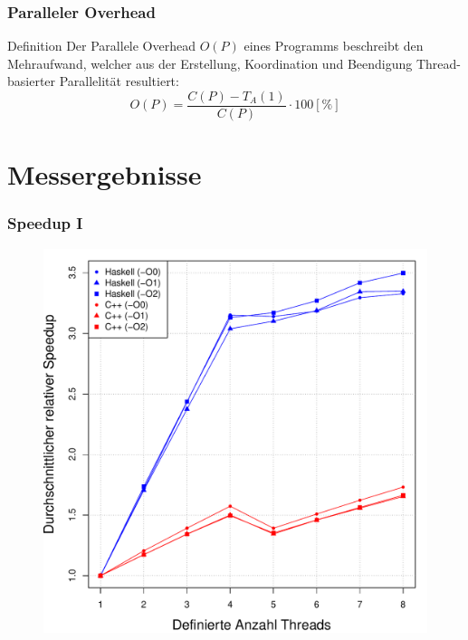 \documentclass[presentation, shownotes]{beamer}
\begin{document}
\begin{frame}
\frametitle{Paralleler Overhead}
    \begin{block}{Definition}
    Der Parallele Overhead $O(P)$ eines Programms beschreibt den Mehraufwand, welcher aus der Erstellung, Koordination und Beendigung Thread- basierter Parallelität resultiert:
    $$O(P) = \frac{C(P) - T_A(1)}{C(P)} \cdot 100 [\%]$$
    \end{block}
\end{frame}

\section{Messergebnisse}

\begin{frame}
\tableofcontents[currentsection]
\end{frame}

\setcounter{subsection}{1}

\begin{frame}
\frametitle{Speedup I}
    \begin{figure}
    \centering
    \includegraphics[height=.8\textheight]{speedup_desktop.pdf}
    \end{figure}
\end{frame}
\end{document}
